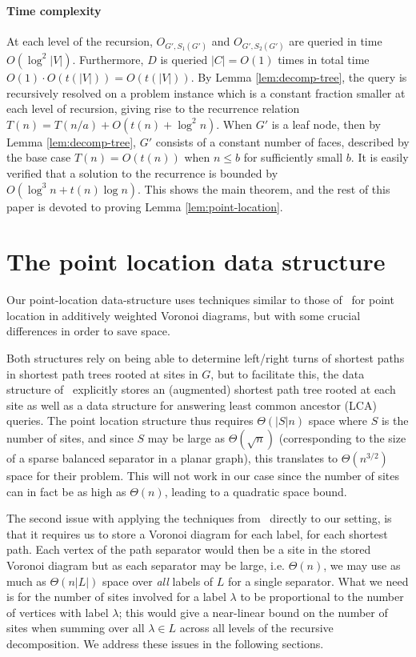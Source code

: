 \documentclass[a4paper,UKenglish,cleveref, autoref, thm-restate]{article}
\begin{document}
\paragraph*{Time complexity} At each level of the recursion, $O_{G',S_1(G')}$ and $O_{G',S_2(G')}$ are queried in time $O(\log^2 |V|)$. Furthermore, $D$ is queried $|C| = O(1)$ times in total time $O(1) \cdot O(t(|V|)) = O(t(|V|))$. By Lemma \ref{lem:decomp-tree}, the query is recursively resolved on a problem instance which is a constant fraction smaller at each level of recursion, giving rise to the recurrence relation $T(n) = T(n/a) + O(t(n) + \log^2 n)$. When $G'$ is a leaf node, then by Lemma \ref{lem:decomp-tree}, $G'$ consists of a constant number of faces, described by the base case $T(n) = O(t(n))$ when $n \leq b$ for sufficiently small $b$. It is easily verified that a solution to the recurrence is bounded by $O(\log^3 n +  t(n)\log n)$. This shows the main theorem, and the rest of this paper is devoted to proving Lemma \ref{lem:point-location}.


\section{The point location data structure} \label{sec:point-location}
Our point-location data-structure uses techniques similar to those of~\cite{Gawrychowski2018} for point location in additively weighted Voronoi diagrams, but with some crucial differences in order to save space.

Both structures rely on being able to determine left/right turns of shortest paths in shortest path trees rooted at sites in $G$, but to facilitate this, the data structure of~\cite{Gawrychowski2018} explicitly stores an (augmented) shortest path tree rooted at each site as well as a data structure for answering least common ancestor (LCA) queries. The point location structure thus requires $\Theta(|S|n)$ space where $S$ is the number of sites, and since $S$ may be large as $\Theta(\sqrt{n})$ (corresponding to the size of a sparse balanced separator in a planar graph), this translates to $\Theta(n^{3/2})$ space for their problem. This will not work in our case since the number of sites can in fact be as high as $\Theta(n)$, leading to a quadratic space bound.

The second issue with applying the techniques from~\cite{Gawrychowski2018} directly to our setting, is that it requires us to store a Voronoi diagram for each label, for each shortest path. Each vertex of the path separator would then be a site in the stored Voronoi diagram but as each separator may be large, i.e. $\Theta(n)$, we may use as much as $\Theta(n|L|)$ space over \emph{all} labels of $L$ for a single separator. What we need is for the number of sites involved for a label $\lambda$ to be proportional to the number of vertices with label $\lambda$; this would give a near-linear bound on the number of sites when summing over all $\lambda\in L$ across all levels of the recursive decomposition. We address these issues in the following sections.
\end{document}
